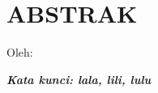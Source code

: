 \clearpage
\chapter*{ABSTRAK}
\begin{center}
    \center
    \begin{singlespace}
      \large\bfseries\MakeUppercase{\thetitle}
      
      \vspace{1cm}
  
      \normalfont\normalsize
      Oleh:
  
      \bfseries \theauthor
    \end{singlespace}
\end{center} 

\begin{singlespace}
    \blindtext

    \textbf{\textit{Kata kunci: lala, lili, lulu}}
\end{singlespace}
\clearpage